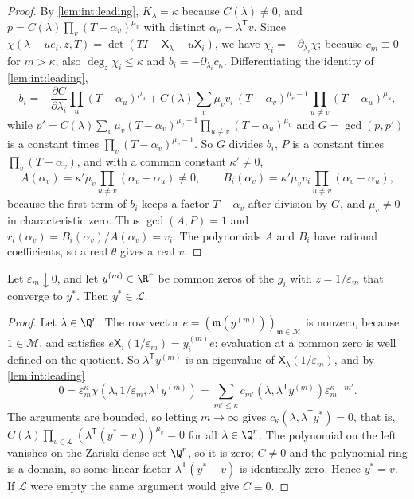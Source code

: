 \begin{proof}
By \cref{lem:int:leading}, $K_\lambda=\kappa$ because $C(\lambda)\ne0$, and
$p=C(\lambda)\prod_v(T-\alpha_v)^{\mu_v}$ with distinct $\alpha_v=\lambda^{\mathsf T}v$.
Since $\chi(\lambda+ue_i,z,T)=\det(TI-\mathsf X_\lambda-u\mathsf X_i)$, we have
$\chi_i=-\partial_{\lambda_i}\chi$; because $c_m\equiv0$ for $m>\kappa$, also
$\deg_z\chi_i\le\kappa$ and $b_i=-\partial_{\lambda_i}c_\kappa$. Differentiating
the identity of \cref{lem:int:leading},
\[
 b_i=-\frac{\partial C}{\partial\lambda_i}\prod_u(T-\alpha_u)^{\mu_u}
 +C(\lambda)\sum_v\mu_vv_i\,(T-\alpha_v)^{\mu_v-1}\prod_{u\ne v}(T-\alpha_u)^{\mu_u},
\]
while $p'=C(\lambda)\sum_v\mu_v(T-\alpha_v)^{\mu_v-1}\prod_{u\ne v}(T-\alpha_u)^{\mu_u}$
and $G=\gcd(p,p')$ is a constant times $\prod_v(T-\alpha_v)^{\mu_v-1}$. So $G$
divides $b_i$, $P$ is a constant times $\prod_v(T-\alpha_v)$, and with a common
constant $\kappa'\ne0$,
\[
 A(\alpha_v)=\kappa'\mu_v\prod_{u\ne v}(\alpha_v-\alpha_u)\ne0,\qquad
 B_i(\alpha_v)=\kappa'\mu_vv_i\prod_{u\ne v}(\alpha_v-\alpha_u),
\]
because the first term of $b_i$ keeps a factor $T-\alpha_v$ after division by
$G$, and $\mu_v\ne0$ in characteristic zero. Thus $\gcd(A,P)=1$ and
$r_i(\alpha_v)=B_i(\alpha_v)/A(\alpha_v)=v_i$. The polynomials $A$ and $B_i$ have
rational coefficients, so a real $\theta$ gives a real $v$.
\end{proof}

\begin{lemma}\label{lem:int:limits}
Let $\varepsilon_m\downarrow0$, and let $y^{(m)}\in\R^r$ be common zeros of the
$g_i$ with $z=1/\varepsilon_m$ that converge to $y^*$. Then $y^*\in\mathcal L$.
\end{lemma}

\begin{proof}
Let $\lambda\in\Q^r$. The row vector $e=(\mathfrak m(y^{(m)}))_{\mathfrak m\in\mathcal M}$ is
nonzero, because $1\in\mathcal M$, and satisfies
$e\mathsf X_i(1/\varepsilon_m)=y^{(m)}_ie$: evaluation at a common zero is well defined
on the quotient. So $\lambda^{\mathsf T}y^{(m)}$ is an eigenvalue of
$\mathsf X_\lambda(1/\varepsilon_m)$, and by \cref{lem:int:leading}
\[
 0=\varepsilon_m^\kappa\chi(\lambda,1/\varepsilon_m,\lambda^{\mathsf T}y^{(m)})
 =\sum_{m'\le\kappa}c_{m'}(\lambda,\lambda^{\mathsf T}y^{(m)})\varepsilon_m^{\kappa-m'} .
\]
The arguments are bounded, so letting $m\to\infty$ gives
$c_\kappa(\lambda,\lambda^{\mathsf T}y^*)=0$, that is,
$C(\lambda)\prod_{v\in\mathcal L}(\lambda^{\mathsf T}(y^*-v))^{\mu_v}=0$ for all
$\lambda\in\Q^r$. The polynomial on the left vanishes on the Zariski-dense set
$\Q^r$, so it is zero; $C\ne0$ and the polynomial ring is a domain, so some
linear factor $\lambda^{\mathsf T}(y^*-v)$ is identically zero. Hence $y^*=v$.
If $\mathcal L$ were empty the same argument would give $C\equiv0$.
\end{proof}

